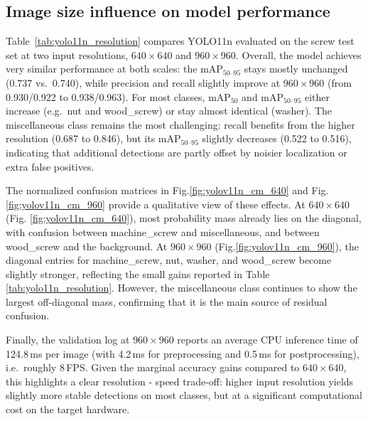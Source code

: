 \documentclass[12pt,a4paper]{report}
\begin{document}
\subsection{Image size influence on model performance}

Table~\ref{tab:yolo11n_resolution} compares YOLO11n evaluated on the screw test set
at two input resolutions, $640\times640$ and $960\times960$. Overall, the model achieves
very similar performance at both scales: the mAP$_{50\text{--}95}$
stays mostly unchanged (0.737 vs.\ 0.740), while precision and recall slightly
improve at $960\times960$ (from 0.930/0.922 to 0.938/0.963). For most classes,
mAP$_{50}$ and mAP$_{50\text{--}95}$ either increase
(e.g.\ nut and wood\_screw) or stay almost identical (washer). The miscellaneous class
remains the most challenging: recall benefits from the higher resolution
(0.687 to 0.846), but its mAP$_{50\text{--}95}$ slightly decreases (0.522 to 0.516),
indicating that additional detections are partly offset by noisier localization or extra false positives.

The normalized confusion matrices in Fig.\ref{fig:yolov11n_cm_640} and Fig.\ref{fig:yolov11n_cm_960} provide
a qualitative view of these effects. At $640\times640$
(Fig. \ref{fig:yolov11n_cm_640}), most probability mass already lies on the diagonal,
with confusion between machine\_screw and miscellaneous,
and between wood\_screw and the background. At $960\times960$
(Fig.\ref{fig:yolov11n_cm_960}), the diagonal entries for machine\_screw,
nut, washer, and wood\_screw become slightly stronger,
reflecting the small gains reported in Table \ref{tab:yolo11n_resolution}. However, the
miscellaneous class continues to show the largest off-diagonal mass,
confirming that it is the main source of residual confusion.

Finally, the validation log at $960\times960$ reports an average CPU inference
time of 124.8\,ms per image (with 4.2\,ms for preprocessing and 0.5\,ms
for postprocessing), i.e.\ roughly 8\,FPS. Given the marginal accuracy gains
compared to $640\times640$, this highlights a clear resolution - speed trade-off:
higher input resolution yields slightly more stable detections on most classes,
but at a significant computational cost on the target hardware.
\end{document}
